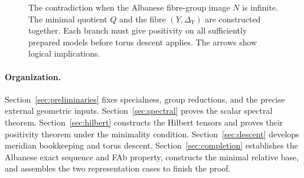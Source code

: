 \begin{figure}[htbp]
\centering

\caption{The contradiction when the Albanese fibre-group image
\(N\) is infinite. The minimal quotient \(Q\) and the fibre
\((Y,\Delta_Y)\) are constructed together. Each branch must give
positivity on all sufficiently prepared models before torus descent
applies. The arrows show logical implications.}
\label{fig:proof}
\end{figure}

\paragraph{Organization.}
Section~\ref{sec:preliminaries} fixes specialness, group reductions,
and the precise external geometric inputs.
Section~\ref{sec:spectral} proves the scalar spectral theorem.
Section~\ref{sec:hilbert} constructs the Hilbert tensors and proves
their positivity theorem under the minimality condition.
Section~\ref{sec:descent} develops meridian bookkeeping and torus
descent. Section~\ref{sec:completion} establishes the Albanese exact
sequence and FAb property, constructs the minimal relative base,
and assembles the two representation cases to finish the proof.
